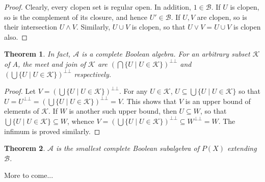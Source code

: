 \documentclass[12pt]{article}
\newtheorem{thm}{Theorem}
\begin{document}
\begin{proof} Clearly, every clopen set is regular open.  In addition, $1\in \mathcal{B}$.  If $U$ is clopen, so is the complement of its closure, and hence $U'\in \mathcal{B}$.  If $U,V$ are clopen, so is their intersection $U\wedge V$.  Similarly, $U\cup V$ is clopen, so that $U\vee V =U\cup V$ is clopen also.  \end{proof}
\begin{thm} In fact, $\mathcal{A}$ is a complete Boolean algebra. For an arbitrary subset $\mathcal{K}$ of $A$, the meet and join of $\mathcal{K}$ are $(\bigcap \lbrace U\mid U\in \mathcal{K}\rbrace)^{\bot\bot}$ and $(\bigcup \lbrace U\mid U\in \mathcal{K}\rbrace)^{\bot\bot}$ respectively.  \end{thm}
\begin{proof}  Let $V=(\bigcup \lbrace U\mid U\in \mathcal{K}\rbrace)^{\bot\bot}$.  For any $U\in \mathcal{K}$, $U\subseteq \bigcup \lbrace U\mid U\in \mathcal{K}\rbrace$ so that $U=U^{\bot\bot}=(\bigcup \lbrace U\mid U\in \mathcal{K}\rbrace)^{\bot\bot} = V$.  This shows that $V$ is an upper bound of elements of $\mathcal{K}$.  If $W$ is another such upper bound, then $U\subseteq W$, so that $\bigcup \lbrace U\mid U\in \mathcal{K}\rbrace \subseteq W$, whence $V=(\bigcup \lbrace U\mid U\in \mathcal{K}\rbrace)^{\bot\bot}\subseteq W^{\bot\bot}=W$.  The infimum is proved similarly.
\end{proof}
\begin{thm} $\mathcal{A}$ is the smallest complete Boolean subalgebra of $P(X)$ extending $\mathcal{B}$. \end{thm}

More to come...
\end{document}

